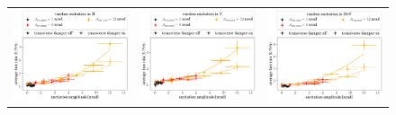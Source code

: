 \documentclass[
prstab
,reprint
,linenumbers
,longbibliography
,preprintnumbers
,showkeys
,amsfonts,amssymb,amsmath
,floatfix
]{revtex4-1}
\newlength{\thirdwidth}
\begin{document}
\begin{figure}
  \begin{tabular}{ccc}
  \includegraphics[width=\thirdwidth]{2017_scale_amp_ranh_lblshort.png} &
  \includegraphics[width=\thirdwidth]{2017_scale_amp_ranv_lblshort.png} &
  \includegraphics[width=\thirdwidth]{2017_scale_amp_ranhv_lblshort.png} \\

\end{tabular}
\end{figure}
\end{document}
